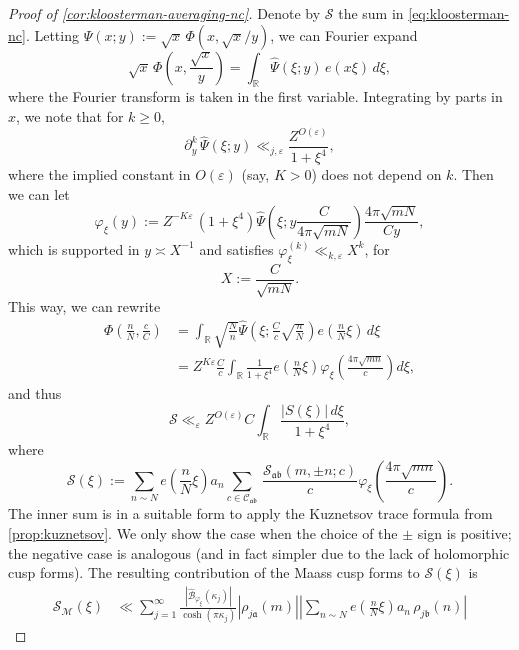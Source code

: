 \documentclass[reqno,11pt]{amsart}
\theoremstyle{remark}
\numberwithin{equation}{section}
\newcommand{\R}{\mathbb{R}}
\newcommand{\mB}{\mathcal{B}}
\newcommand{\mC}{\mathcal{C}}
\newcommand{\mM}{\mathcal{M}}
\newcommand{\mS}{\mathcal{S}}
\newcommand{\ma}{\mathfrak{a}}
\newcommand{\mb}{\mathfrak{b}}
\newcommand{\eps}{\varepsilon}
\renewcommand{\hat}{\widehat}
\begin{document}
\begin{proof}[Proof of \cref{cor:kloosterman-averaging-nc}]
Denote by $\mS$ the sum in \cref{eq:kloosterman-nc}. 
Letting $\Psi(x; y) := \sqrt{x}\, \Phi(x, \sqrt{x}/y)$, we can Fourier expand
\[
    \sqrt{x}\, \Phi\left(x, \frac{\sqrt{x}}{y} \right) = \int_\R \hat{\Psi}(\xi; y) \, e(x\xi)\, d\xi,
\]
where the Fourier transform is taken in the first variable. Integrating by parts in $x$, we note that for $k \ge 0$,
\[
    \partial_y^k\, \hat{\Psi}(\xi; y) \ll_{j,\eps} \frac{Z^{O(\eps)}}{1 + \xi^4},
\]
where the implied constant in $O(\eps)$ (say, $K > 0$) does not depend on $k$. Then we can let
\[
    \varphi_{\xi}(y) := Z^{-K\eps}\, \left(1 + \xi^4 \right) \hat{\Psi}\left(\xi; y \frac{C}{4\pi \sqrt{mN}} \right) \frac{4\pi \sqrt{mN}}{C y},
\]
which is supported in $y \asymp X^{-1}$ and satisfies $\varphi_\xi^{(k)} \ll_{k,\eps} X^k$, for
\begin{equation} \label{eq:X-CmN}
    X := \frac{C}{\sqrt{mN}}.
\end{equation}
This way, we can rewrite
\[
\begin{aligned}
    \Phi\left(\frac{n}{N}, \frac{c}{C}\right)
    &=
    \int_\R \sqrt{\frac{N}{n}} \hat{\Psi}\left(\xi; \frac{C}{c} \sqrt{\frac{n}{N}}\right) e\left(\frac{n}{N} \xi \right)\, d\xi
    \\
    &=
    Z^{K\eps} \frac{C}{c}
    \int_\R \frac{1}{1 + \xi^4} e\left(\frac{n}{N} \xi \right) \varphi_\xi\left(\frac{4\pi \sqrt{mn}}{c}\right) d\xi,
\end{aligned}
\]
and thus
\begin{equation} \label{eq:S-split-xi}
    \mS \ll_\eps Z^{O(\eps)} C \int_\R \frac{|S(\xi)|\, d\xi}{1+\xi^4}, 
\end{equation}
where
\[
    \mS(\xi) := \sum_{n \sim N} e\left(\frac{n}{N} \xi\right) a_n
    \sum_{c \in \mC_{\ma\mb}}\,
    \frac{\mS_{\ma\mb}(m, \pm n; c)}{c} 
    \varphi_\xi\left(\frac{4\pi \sqrt{mn}}{c}\right).
\]
The inner sum is in a suitable form to apply the Kuznetsov trace formula from \cref{prop:kuznetsov}. We only show the case when the choice of the $\pm$ sign is positive; the negative case is analogous (and in fact simpler due to the lack of holomorphic cusp forms). The resulting contribution of the Maass cusp forms to $\mS(\xi)$ is
\[
\begin{aligned}
    \mS_{\mM}(\xi) 
    &\ll \sum_{j=1}^\infty \frac{|\hat{\mB}_{\varphi_\xi}(\kappa_j)|}{\cosh(\pi \kappa_j)} 
    |\rho_{j\ma}(m)| \left\vert \sum_{n \sim N} e\left(\frac{n}{N} \xi\right) a_n\,  
    \rho_{j\mb}(n)\right\vert

\end{aligned}\]
\end{proof}
\end{document}

